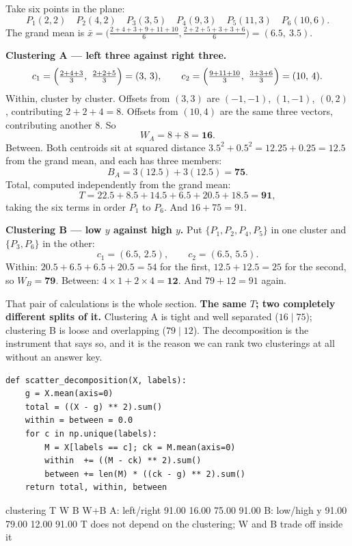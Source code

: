 \documentclass[11pt]{article}
\begin{document}
\begin{worked}
Take six points in the plane:
\[
  P_1(2,2)\quad P_2(4,2)\quad P_3(3,5)\quad
  P_4(9,3)\quad P_5(11,3)\quad P_6(10,6).
\]
The grand mean is
$\bar{x} = \bigl(\tfrac{2+4+3+9+11+10}{6}, \tfrac{2+2+5+3+3+6}{6}\bigr)
 = (6.5,\ 3.5)$.

\medskip
\textbf{Clustering A --- left three against right three.}
\[
  c_1 = \Bigl(\tfrac{2+4+3}{3},\ \tfrac{2+2+5}{3}\Bigr) = (3,\,3),
  \qquad
  c_2 = \Bigl(\tfrac{9+11+10}{3},\ \tfrac{3+3+6}{3}\Bigr) = (10,\,4).
\]
Within, cluster by cluster. Offsets from $(3,3)$ are $(-1,-1)$, $(1,-1)$,
$(0,2)$, contributing $2 + 2 + 4 = 8$. Offsets from $(10,4)$ are the same
three vectors, contributing another $8$. So
\[
  W_A = 8 + 8 = \mathbf{16}.
\]
Between. Both centroids sit at squared distance
$3.5^2 + 0.5^2 = 12.25 + 0.25 = 12.5$ from the grand mean, and each has three
members:
\[
  B_A = 3(12.5) + 3(12.5) = \mathbf{75}.
\]
Total, computed independently from the grand mean:
\[
  T = 22.5 + 8.5 + 14.5 + 6.5 + 20.5 + 18.5 = \mathbf{91},
\]
taking the six terms in order $P_1$ to $P_6$. And $16 + 75 = 91$. \checkmark

\medskip
\textbf{Clustering B --- low $y$ against high $y$.} Put
$\{P_1,P_2,P_4,P_5\}$ in one cluster and $\{P_3,P_6\}$ in the other:
\[
  c_1 = (6.5,\,2.5), \qquad c_2 = (6.5,\,5.5).
\]
Within: $20.5 + 6.5 + 6.5 + 20.5 = 54$ for the first, $12.5 + 12.5 = 25$ for
the second, so $W_B = \mathbf{79}$. Between:
$4 \times 1 + 2 \times 4 = \mathbf{12}$. And $79 + 12 = 91$ again.
\end{worked}

That pair of calculations is the whole section. \textbf{The same $T$; two
completely different splits of it.} Clustering A is tight and well separated
($16 \mid 75$); clustering B is loose and overlapping ($79 \mid 12$). The
decomposition is the instrument that says so, and it is the reason we can rank
two clusterings at all without an answer key.

\begin{lstlisting}
def scatter_decomposition(X, labels):
    g = X.mean(axis=0)
    total = ((X - g) ** 2).sum()
    within = between = 0.0
    for c in np.unique(labels):
        M = X[labels == c]; ck = M.mean(axis=0)
        within  += ((M - ck) ** 2).sum()
        between += len(M) * ((ck - g) ** 2).sum()
    return total, within, between
\end{lstlisting}
\begin{codeout}
clustering              T        W        B        W+B
A: left/right       91.00    16.00    75.00      91.00
B: low/high y       91.00    79.00    12.00      91.00
T does not depend on the clustering; W and B trade off inside it
\end{codeout}
\end{document}
